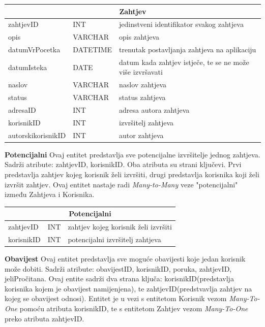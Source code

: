 			\begin{tabularx} {\textwidth} {|p{3.5cm}|p{2cm}|X|}
				
				\hline
				\multicolumn{3}{|c|}{\textbf{Zahtjev}} \\
				\hline
				
				\cellcolor{LightGreen}zahtjevID & INT	& jedinstveni identifikator svakog zahtjeva	\\ \hline
				opis	& VARCHAR &  opis zahtjeva 	\\ \hline 
				datumVrPocetka & DATETIME &  trenutak postavljanja zahtjeva na aplikaciju \\ \hline 
				datumIsteka & DATE	&  datum kada zahtjev istječe, te se ne može više izvršavati		\\ \hline
				naslov & VARCHAR	&  naslov zahtjeva
				\\
				\hline
				status & VARCHAR & status zahtjeva  \\ \hline
				\cellcolor{LightBlue} adresaID	& INT &  adresa autora zahtjeva 	\\ \hline 
				\cellcolor{LightBlue} korisnikID	& INT &  izvršitelj zahtjeva 	\\ \hline
				\cellcolor{LightBlue} autorskikorisnikID	& INT &   autor zahtjeva	\\ \hline
				
				
			\end{tabularx}
			
			\bigskip
			\bigskip
			\textbf{Potencijalni} Ovaj entitet predstavlja sve potencijalne izvršitelje jednog zahtjeva. Sadrži atribute: zahtjevID, korisnikID. Oba atributa su strani ključevi. Prvi predstavlja zahtjev kojeg korisnik želi izvršiti, drugi predstavlja korisnika koji želi izvršit zahtjev. Ovaj entitet nastaje radi \textit{Many-to-Many} veze "potencijalni" između Zahtjeva i Korisnika.
			\bigskip
			
			\begin{tabularx}{\textwidth} {|p{2cm}|p{2cm}|X|}
				\hline
				\multicolumn{3}{|c|}{\textbf{Potencijalni}} \\
				\hline
				\cellcolor{LightGreen} zahtjevID & INT & zahtjev kojeg korisnik želi izvršiti \\
				\hline
				\cellcolor{LightGreen} korisnikID & INT & potencijalni izvršitelj zahtjeva \\
				\hline
			\end{tabularx}
			
			\bigskip
			\bigskip
			\textbf{Obavijest} Ovaj entitet predstavlja sve moguće obavijesti koje jedan korisnik može dobiti. Sadrži atribute: obavijestID, korisnikID,
			poruka, zahtjevID, jeliPročitana. Ovaj entite sadrži dva strana ključa: korisnikID(predstavlja korisnika kojem je obavijest namijenjena), te zahtjevID(predstvavlja zahtjev na kojeg se obavijest odnosi). Entitet je u vezi s entitetom Korisnik vezom \textit{Many-To-One} pomoću atributa korisnikID, te s entitetom Zahtjev vezom \textit{Many-To-One} preko atributa zahtjevID.
			\bigskip
			
